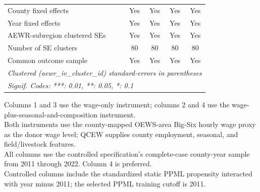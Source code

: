 \begin{table}[htbp]
\begin{tabular}{lcccc}
      County fixed effects                 & Yes       & Yes                  & Yes                  & Yes\\
      Year fixed effects                   & Yes       & Yes                  & Yes                  & Yes\\
      AEWR-subregion clustered SEs         & Yes       & Yes                  & Yes                  & Yes\\
      Number of SE clusters                & 80        & 80                   & 80                   & 80\\
      Common outcome sample                & Yes       & Yes                  & Yes                  & Yes\\
      \midrule \midrule
      \multicolumn{5}{l}{\emph{Clustered (aewr\_iv\_cluster\_id) standard-errors in parentheses}}\\
      \multicolumn{5}{l}{\emph{Signif. Codes: ***: 0.01, **: 0.05, *: 0.1}}\\
   \end{tabular}

   \par \raggedright
   Columns 1 and 3 use the wage-only instrument; columns 2 and 4 use the wage-plus-seasonal-and-composition instrument.\\
   Both instruments use the county-mapped OEWS-area Big-Six hourly wage proxy as the donor wage level; QCEW supplies county employment, seasonal, and field/livestock features.\\
   All columns use the controlled specification's complete-case county-year sample from 2011 through 2022. Column 4 is preferred.\\
   Controlled columns include the standardized static PPML propensity interacted with year minus 2011; the selected PPML training cutoff is 2011.
\end{table}


